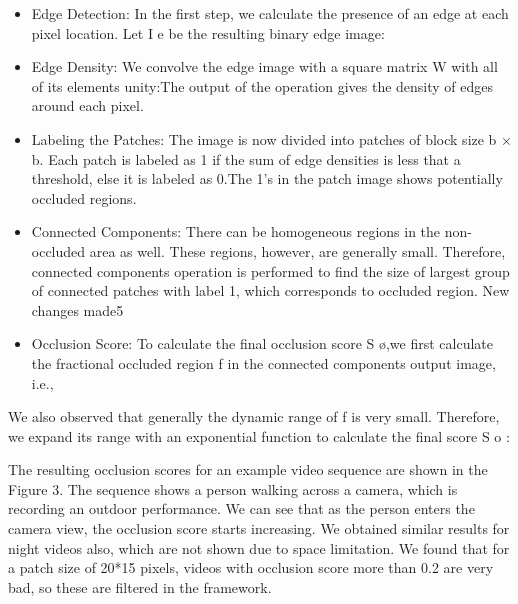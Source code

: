 \documentclass{sig-alternate}
\begin{document}
\begin{itemize}
    \item Edge Detection: In the first step, we calculate the presence of an edge at each pixel location. Let I e be the resulting binary edge image:
    
    \item Edge Density: We convolve the edge image with a square matrix W with all of its elements unity:The output of the operation gives the density of edges around each pixel.
    
    \item Labeling the Patches: The image is now divided into patches of block size b × b. Each patch is labeled as 1 if the sum of edge densities is less that a threshold, else it is labeled as 0.The 1’s in the patch image shows potentially occluded regions.
    
    \item Connected Components: There can be homogeneous regions in the non-occluded area as well. These regions, however, are generally small. Therefore, connected components operation is performed to find the size of largest group of connected patches with label 1, which corresponds to occluded region.
    New changes made5
    \item Occlusion Score: To calculate the final occlusion score S \o ,we first calculate the fractional occluded region f in the connected components output image, i.e.,
\end{itemize}
We also observed that generally the dynamic range of f is very small. Therefore, we expand its range with an exponential function to calculate the final score S o :

The resulting occlusion scores for an example video sequence are shown in the Figure 3. The sequence shows a person walking across a camera, which is recording an outdoor performance. We can see that as the person enters the camera view, the occlusion score starts increasing. We obtained similar results for night videos also, which are not shown due to space limitation. We found that for a patch size of 20*15 pixels, videos with occlusion score more than 0.2 are very bad, so these are filtered in the framework.
\end{document}
